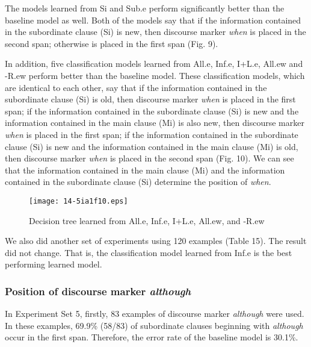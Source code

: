 \documentclass[english]{jnlp_1.3e}
\begin{document}
The models learned from Si and Sub.e perform significantly better
than the baseline model as well. Both of the models say that if the 
information contained in the subordinate clause (Si) is new, 
then discourse marker \textit{when} is placed in the second 
span; otherwise is placed in the first span (Fig. 9). 

In addition, five classification models learned from All.e, Inf.e, I+L.e, All.ew 
and -R.ew perform better than the baseline model.
These classification models, which are identical to each other,
say that if the information contained in the subordinate clause (Si)
is old, then discourse marker \textit{when} is placed 
in the first span; if the information contained in the subordinate 
clause (Si) is new and the information contained in the main clause (Mi) is also new, 
then discourse marker \textit{when} is placed in the first span; if the information
contained in the subordinate clause (Si) is new and the information
contained in the main clause (Mi) is old, then discourse marker 
\textit{when} is placed in the second span (Fig. 10). 
We can see that the information contained in the main clause (Mi)
and the information contained in the subordinate clause (Si)
determine the position of \textit{when}.

\begin{figure}[t]
\begin{center}
\texttt{[image: 14-5ia1f10.eps]}
\end{center}
 \caption{Decision tree learned from All.e, Inf.e, I+L.e, All.ew, and -R.ew}
\end{figure}
\begin{table}[t]

\end{table}


We also did another set of experiments using 120 examples (Table 15). 
The result did not change. That is, the classification model learned from
Inf.e is the best performing learned model.  


\subsubsection{Position of discourse marker \textit{although}}

In Experiment Set 5, firstly, 83 examples of discourse marker \textit{although} 
were used. In these examples, 69.9\% (58/83) of subordinate 
clauses beginning with \textit{although} occur in the first span. 
Therefore, the error rate of the baseline model is 30.1\%.  
\end{document}
